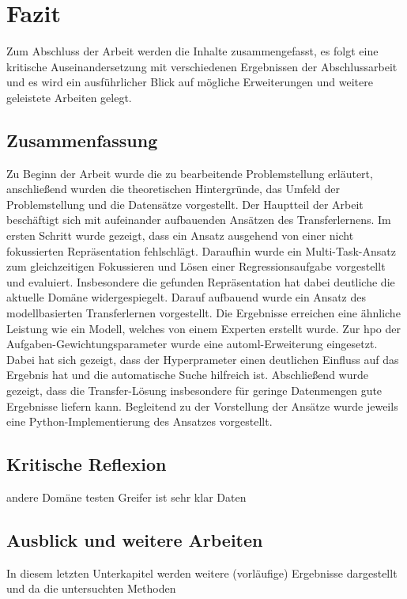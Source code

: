 \chapter{Fazit}
\label{chap:Fazit}
Zum Abschluss der Arbeit werden die Inhalte zusammengefasst, es folgt eine kritische Auseinandersetzung mit verschiedenen Ergebnissen der Abschlussarbeit und es wird ein ausführlicher Blick auf mögliche Erweiterungen und weitere geleistete Arbeiten gelegt.
 
	\section{Zusammenfassung}
	\label{sec:Zusammenfassung}
	Zu Beginn der Arbeit wurde die zu bearbeitende Problemstellung erläutert, anschließend wurden die theoretischen Hintergründe, das Umfeld der Problemstellung und die Datensätze vorgestellt. Der Hauptteil der Arbeit beschäftigt sich mit aufeinander aufbauenden Ansätzen des Transferlernens. Im ersten Schritt wurde gezeigt, dass ein Ansatz ausgehend von einer nicht fokussierten Repräsentation fehlschlägt. Daraufhin wurde ein Multi-Task-Ansatz zum gleichzeitigen Fokussieren und Lösen einer Regressionsaufgabe vorgestellt und evaluiert. Insbesondere die gefunden Repräsentation hat dabei deutliche die aktuelle Domäne widergespiegelt. Darauf aufbauend wurde ein Ansatz des modellbasierten Transferlernen vorgestellt. Die Ergebnisse erreichen eine ähnliche Leistung wie ein Modell, welches von einem Experten erstellt wurde. Zur \ac{hpo} der Aufgaben-Gewichtungsparameter wurde eine \ac{automl}-Erweiterung eingesetzt. Dabei hat sich gezeigt, dass der Hyperprameter einen deutlichen Einfluss auf das Ergebnis hat und die automatische Suche hilfreich ist. Abschließend wurde gezeigt, dass die Transfer-Lösung insbesondere für geringe Datenmengen gute Ergebnisse liefern kann. Begleitend zu der Vorstellung der Ansätze wurde jeweils eine Python-Implementierung des Ansatzes vorgestellt. 
			
	\section{Kritische Reflexion}
	\label{sec:KritischeReflexion}
	
	andere Domäne testen Greifer ist sehr klar		
	Daten	
				
	\section{Ausblick und weitere Arbeiten}
	\label{sec:AusblickWeitereArbeiten}
	In diesem letzten Unterkapitel werden weitere (vorläufige) Ergebnisse dargestellt und da die untersuchten Methoden 
	

